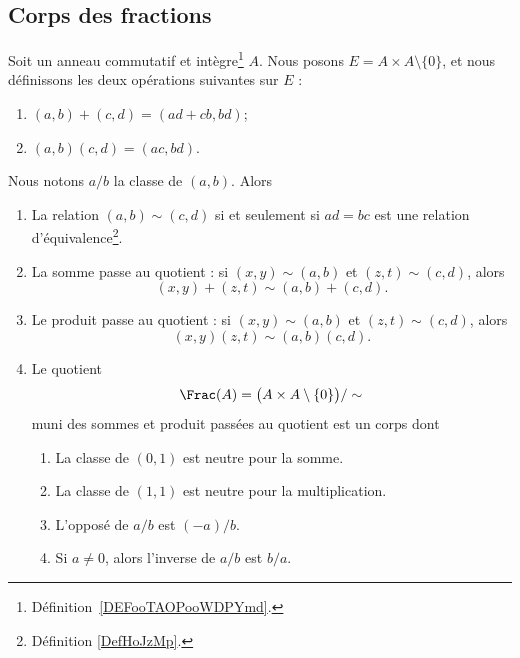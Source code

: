\subsection{Corps des fractions}

\begin{proposition}       \label{DEFooGJYXooOiJQvP}
	Soit un anneau commutatif et intègre\footnote{Définition~\ref{DEFooTAOPooWDPYmd}.} \( A\). Nous posons \( E=A\times A\setminus\{ 0 \}\), et nous définissons les deux opérations suivantes sur \( E\) :
	\begin{enumerate}
		\item       \label{ITEMooWBWHooYsXFkO}
		      \( (a,b)+(c,d)=(ad+cb,bd)\);
		\item       \label{ITEMooGOOIooCHqLRl}
		      \( (a,b)(c,d)=(ac,bd)\).
	\end{enumerate}
	Nous notons \( a/b\) la classe de \( (a,b)\). Alors
	\begin{enumerate}
		\item	\label{ITEMooRXFAooUqQfIV}
		      La relation \( (a,b)\sim(c,d)\) si et seulement si \( ad=bc\) est une relation d'équivalence\footnote{Définition \ref{DefHoJzMp}.}.
		\item		\label{ITEMooSFZEooUqFGIB}
		      La somme passe au quotient : si \( (x,y)\sim(a,b)\) et \( (z,t)\sim(c,d)\), alors
		      \begin{equation}
			      (x,y)+(z,t)\sim(a,b)+(c,d).
		      \end{equation}
		\item   \label{ITEMooIZDTooEoALGh}
		      Le produit passe au quotient : si \( (x,y)\sim(a,b)\) et \( (z,t)\sim(c,d)\), alors
		      \begin{equation}
			      (x,y)(z,t)\sim(a,b)(c,d).
		      \end{equation}

		\item		\label{ITEMooOTZJooMkarjT}
		      Le quotient
		      \begin{equation}
			      \Frac(A)=\big( A\times A\setminus\{ 0 \} \big)/\sim
		      \end{equation}
		      muni des sommes et produit passées au quotient est un corps dont
		      \begin{enumerate}
			      \item \label{ITEMooLFSEooAIrbFK}
			            La classe de \( (0,1)\) est neutre pour la somme.
			      \item	\label{ITEMooYUNEooAKZJEh}
			            La classe de \( (1,1)\) est neutre pour la multiplication.
			      \item		\label{ITEMooOGPCooAZGWoF}
			            L'opposé de \( a/b\) est \( (-a)/b\).
			      \item		\label{ITEMooECDBooJdJEza}
			            Si \( a\neq 0\), alors l'inverse de \( a/b\) est \( b/a\).
		      \end{enumerate}


\end{enumerate}
\end{proposition}
